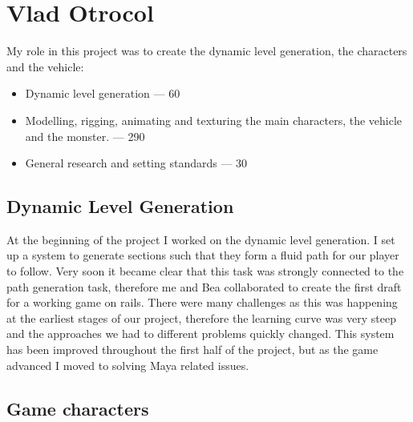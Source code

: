 \documentclass[a4paper,oneside]{memoir}
\begin{document}
		\section{Vlad Otrocol}      
	     My role in this project was to create the dynamic level generation, the characters and the vehicle:

			\begin{itemize}
        \item Dynamic level generation --- 60
		    \item Modelling, rigging, animating and texturing the main characters, the vehicle and the monster. --- 290
        \item General research and setting standards --- 30
			\end{itemize}
            
            \subsection{Dynamic Level Generation}
                
                At the beginning of the project I worked on the dynamic level generation. I set up a system to generate sections such that they form a fluid path for our player to follow. Very soon it became clear that this task was strongly connected to the path generation task, therefore me and Bea collaborated to create the first draft for a working game on rails. There were many challenges as this was happening at the earliest stages of our project, therefore the learning curve was very steep and the approaches we had to different problems quickly changed. This system has been improved throughout the first half of the project, but as the game advanced I moved to solving Maya related issues.
                
            \subsection{Game characters}
                
\end{document}
